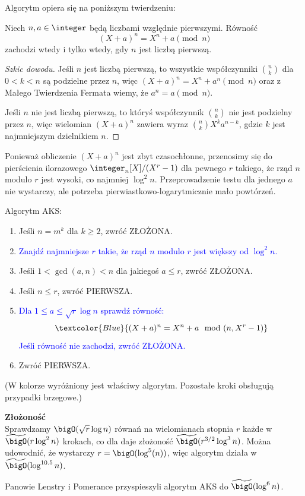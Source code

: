 Algorytm opiera się na poniższym twierdzeniu:

\begin{theorem}
	Niech \( n, a \in \integer \) będą liczbami względnie pierwszymi. Równość
	\[
		(X + a)^n = X^n + a \pmod{n}
	\]
	zachodzi wtedy i tylko wtedy, gdy \( n \) jest liczbą pierwszą.
\end{theorem}
\begin{proof}[Szkic dowodu]
	Jeśli \( n \) jest liczbą pierwszą, to wszystkie współczynniki \( n \choose k \) dla \( 0 < k < n \) są podzielne przez \( n \), więc \( (X + a)^n = X^n + a^n \pmod{n} \) oraz z Małego Twierdzenia Fermata wiemy, że \( a^n = a \pmod{n} \).

	Jeśli \( n \) nie jest liczbą pierwszą, to któryś współczynnik \( n \choose k \) nie jest podzielny przez \( n \), więc wielomian \( (X + a)^n \) zawiera wyraz \( {n \choose k} X^ka^{n-k} \), gdzie \( k \) jest najmniejszym dzielnikiem \( n \).
\end{proof}

Ponieważ obliczenie \( (X + a)^n \) jest zbyt czasochłonne, przenosimy się do pierścienia ilorazowego \( \integer_n[X]/(X^r - 1) \) dla pewnego \( r \) takiego, że rząd \( n \)
modulo \( r \) jest wysoki, co najmniej \( \log^2n \). Przeprowadzenie testu dla jednego \( a \) nie wystarczy, ale potrzeba pierwiastkowo-logarytmicznie mało powtórzeń.

\begin{greyframe}
	Algorytm AKS:
	\begin{enumerate}
		\item Jeśli \( n = m^k \) dla \( k \geq 2 \), zwróć ZŁOŻONA.
		\item \textcolor{Blue}{Znajdź najmniejsze \( r \) takie, że rząd \( n \) modulo \( r \) jest większy od \( \log^2n \).}
		\item Jeśli \( 1 < \gcd(a, n) < n \) dla jakiegoś \( a \leq r \), zwróć ZŁOŻONA.
		\item Jeśli \( n \leq r \), zwróć PIERWSZA.
		\item \textcolor{Blue}{Dla \( 1 \leq a \leq \sqrt{r}\log n \) sprawdź równość:}
		      \[
			      \textcolor{Blue}{(X + a)^n = X^n + a \mod (n, X^r-1)}
		      \]
		      \textcolor{Blue}{Jeśli równość nie zachodzi, zwróć ZŁOŻONA.}
		\item Zwróć PIERWSZA.
	\end{enumerate}
\end{greyframe}
{\small (W kolorze wyróżniony jest właściwy algorytm. Pozostałe kroki obsługują przypadki brzegowe.)}

\textbf{Złożoność} \\
Sprawdzamy \( \bigO(\sqrt{r} \log n) \) równań na wielomianach stopnia \( r \) każde w \( \widetilde{\bigO}(r \log^2n) \) krokach, co dla daje złożoność \( \widetilde{\bigO}(r^{3/2} \log^3n) \). Można udowodnić, że wystarczy \( r = \bigO(\log^5(n)) \), więc algorytm działa w \( \widetilde{\bigO}(\log^{10.5}n)\).

Panowie Lenstry i Pomerance przyspieszyli algorytm AKS do \( \widetilde{\bigO}(\log^6n) \).
